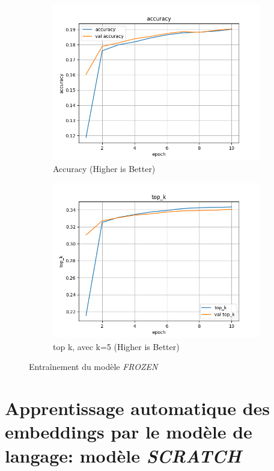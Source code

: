 \documentclass[a4paper]{article}
\begin{document}
\begin{figure}[ht]
  \begin{subfigure}{0.47\textwidth}
    \includegraphics[width=\linewidth]{../logs/word2vect/accuracy.png}
    \caption{Accuracy (Higher is Better)}
  \end{subfigure}
  \hfill
  \begin{subfigure}{0.47\textwidth}
    \includegraphics[width=\linewidth]{../logs/word2vect/top_k.png}
    \caption{top k, avec k=5 (Higher is Better)}
  \end{subfigure}
  \caption{Entraînement du modèle \textit{FROZEN}}
  \label{subfig:result model 1}
\end{figure}


\section{Apprentissage automatique des embeddings par le modèle de langage: modèle \textit{SCRATCH}}
\end{document}
